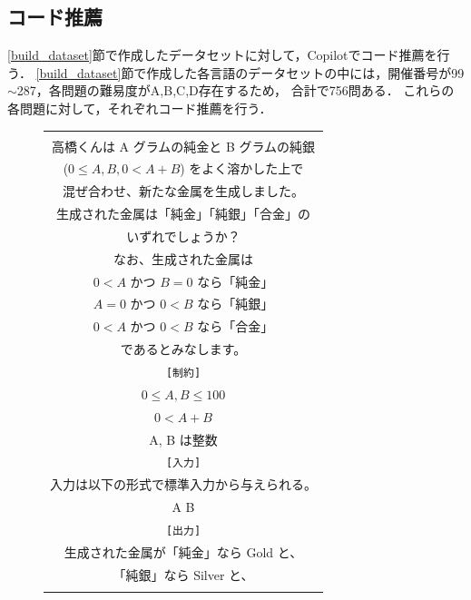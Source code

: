  \subsection{コード推薦\label{recommend_program}}
    \ref{build_dataset}節で作成したデータセットに対して，Copilotでコード推薦を行う．
    \ref{build_dataset}節で作成した各言語のデータセットの中には，開催番号が99${\sim}$287，各問題の難易度がA,B,C,D存在するため，
    合計で756問ある．
    これらの各問題に対して，それぞれコード推薦を行う．
    
    \begin{figure}[t]
      \begin{tabular}{c}
        \begin{tabularx}{23zw}{l}
          \hline
          \verb|[問題文]| \\
          \textrm{  高橋くんは A グラムの純金と B グラムの純銀} \\
          \textrm{  ($0 \leq A, B, 0 < A+B$) をよく溶かした上で} \\
          \textrm{  混ぜ合わせ、新たな金属を生成しました。} \\
          \textrm{  生成された金属は「純金」「純銀」「合金」の} \\
          \textrm{  いずれでしょうか？} \\
          \textrm{  なお、生成された金属は} \\
          \textrm{  $0 < A$ かつ $B = 0$ なら「純金」} \\
          \textrm{  $A = 0$ かつ $0 < B$ なら「純銀」} \\
          \textrm{  $0 < A$ かつ $0 < B$ なら「合金」} \\
          \textrm{  であるとみなします。} \\
          \verb|[制約]| \\
          \textrm{  $0 \leq A,B \leq 100$} \\
          \textrm{  $0 < A+B$} \\
          \textrm{  A, B は整数} \\
          \verb|[入力]| \\
          \textrm{  入力は以下の形式で標準入力から与えられる。} \\
          \textrm{  A B} \\
          \verb|[出力]| \\
          \textrm{  生成された金属が「純金」なら Gold と、} \\
          \textrm{  「純銀」なら Silver と、} \\

\end{tabularx}
\end{tabular}
\end{figure}

